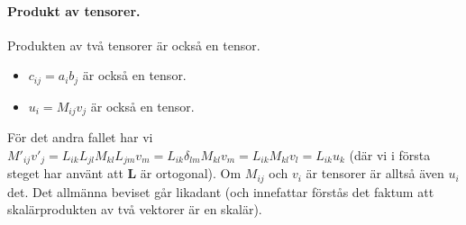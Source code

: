 \documentclass[%
oneside,                 %
final,                   %
10pt]{article}
\newenvironment{warning_mdfboxadmon}[1][]{
\begin{warning_mdfboxmdframed}[frametitle=#1]
}
{
\end{warning_mdfboxmdframed}
}
\begin{document}
\paragraph{Produkt av tensorer.}
Produkten av två tensorer är också en tensor.
\begin{itemize}
\item $c_{ij}=a_i b_j$ är också en tensor. 

\item $u_i=M_{ij}v_j$ är också en tensor. 
\end{itemize}

\noindent

\begin{warning_mdfboxadmon}[Kommentar]
För det andra fallet har vi $M'_{ij}v'_j=L_{ik}L_{jl}M_{kl}L_{jm}v_m=L_{ik}\delta_{lm}M_{kl}v_m=L_{ik}M_{kl}v_l
=L_{ik}u_k$ (där vi i första steget har använt att $\mathbf{L}$ är ortogonal). Om $M_{ij}$ och $v_i$ är tensorer är alltså även $u_i$ det. Det allmänna beviset går likadant (och innefattar förstås det faktum att skalärprodukten av två vektorer är en skalär).
\end{warning_mdfboxadmon} %
\end{document}
